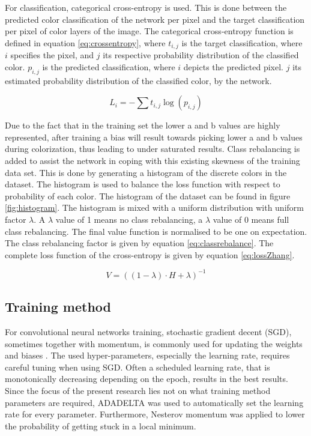 For classification, categorical cross-entropy is used. This is done between the predicted color classification of the network per pixel and the target classification per pixel of color layers of the image. The categorical cross-entropy function is defined in equation \ref{eq:crossentropy}, where $t_{i,j}$ is the target classification, where $i$ specifies the pixel, and $j$ its respective probability distribution of the classified color. 
$p_{i,j}$ is the predicted classification, where $i$ depicts the predicted pixel. $j$ its estimated probability distribution of the classified color, by the network.

\begin{equation}
\label{eq:crossentropy}
L_{i} = -\sum t_{i,j}\log(p_{i,j})
\end{equation}

Due to the fact that in the training set the lower a and b values are highly represented, after training a bias will result towards picking lower a and b values during colorization, thus leading to under saturated results. 
Class rebalancing is added to assist the network in coping with this existing skewness of the training data set. This is done by generating a histogram of the discrete colors in the dataset. The histogram is used to balance the loss function with respect to probability of each color. The histogram of the dataset can be found in figure \ref{fig:histogram}. The  histogram is mixed with a uniform distribution with uniform factor $\lambda$. A $\lambda$ value of 1 means no class rebalancing, a $\lambda$ value of 0 means full class rebalancing. The final value function is normalised to be one on expectation. The class rebalancing factor is given by equation \ref{eq:classrebalance}. The complete loss function of the cross-entropy is given by equation \ref{eq:lossZhang}.

\begin{equation}\label{eq:classrebalance}
V = ((1 - \lambda)\cdot H + \lambda)^{-1}
\end{equation}
 
\subsection{Training method}
For convolutional neural networks training, stochastic gradient decent (SGD), sometimes together with momentum, is commonly used for updating the weights and biases \cite{IizukaSIGGRAPH2016}\cite{Simonyan}. The used hyper-parameters, especially the learning rate, requires careful tuning when using SGD. Often a scheduled learning rate, that is monotonically decreasing depending on the epoch, results in the best results. Since the focus of the present research lies not on what training method parameters are required, ADADELTA was used to automatically set the learning rate for every parameter\cite{zeiler2012adadelta}. Furthermore, Nesterov momentum was applied to lower the probability of getting stuck in a local minimum\cite{sutskever2013importance}.

